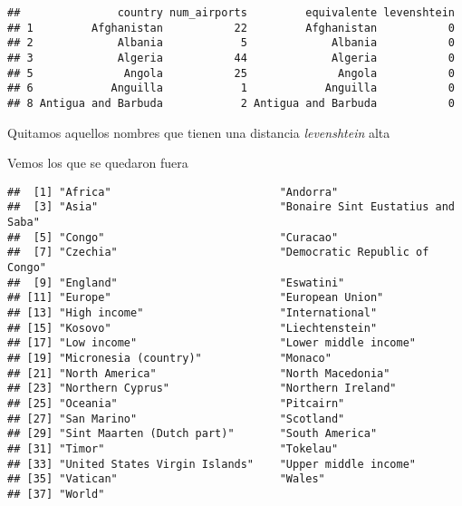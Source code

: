 \documentclass[
]{article}
\newenvironment{Shaded}{\begin{snugshade}}{\end{snugshade}}
\newcommand{\DecValTok}[1]{\textcolor[rgb]{0.86,0.86,0.80}{#1}}
\newcommand{\NormalTok}[1]{\textcolor[rgb]{0.80,0.80,0.80}{#1}}
\newcommand{\OperatorTok}[1]{\textcolor[rgb]{0.94,0.94,0.82}{#1}}
\newcommand{\OtherTok}[1]{\textcolor[rgb]{0.94,0.94,0.56}{#1}}
\newcommand{\StringTok}[1]{\textcolor[rgb]{0.80,0.58,0.58}{#1}}
\begin{document}
\begin{verbatim}
##               country num_airports         equivalente levenshtein
## 1         Afghanistan           22         Afghanistan           0
## 2             Albania            5             Albania           0
## 3             Algeria           44             Algeria           0
## 5              Angola           25              Angola           0
## 6            Anguilla            1            Anguilla           0
## 8 Antigua and Barbuda            2 Antigua and Barbuda           0
\end{verbatim}

Quitamos aquellos nombres que tienen una distancia \emph{levenshtein}
alta

\begin{Shaded}
\end{Shaded}

Vemos los que se quedaron fuera

\begin{Shaded}
\end{Shaded}

\begin{verbatim}
##  [1] "Africa"                          "Andorra"                        
##  [3] "Asia"                            "Bonaire Sint Eustatius and Saba"
##  [5] "Congo"                           "Curacao"                        
##  [7] "Czechia"                         "Democratic Republic of Congo"   
##  [9] "England"                         "Eswatini"                       
## [11] "Europe"                          "European Union"                 
## [13] "High income"                     "International"                  
## [15] "Kosovo"                          "Liechtenstein"                  
## [17] "Low income"                      "Lower middle income"            
## [19] "Micronesia (country)"            "Monaco"                         
## [21] "North America"                   "North Macedonia"                
## [23] "Northern Cyprus"                 "Northern Ireland"               
## [25] "Oceania"                         "Pitcairn"                       
## [27] "San Marino"                      "Scotland"                       
## [29] "Sint Maarten (Dutch part)"       "South America"                  
## [31] "Timor"                           "Tokelau"                        
## [33] "United States Virgin Islands"    "Upper middle income"            
## [35] "Vatican"                         "Wales"                          
## [37] "World"
\end{verbatim}
\end{document}
